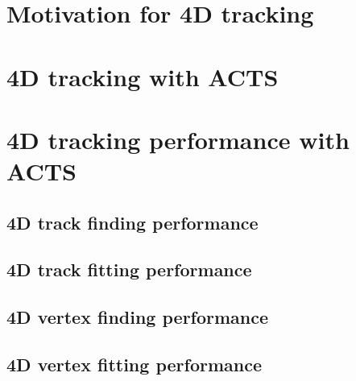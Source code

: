 
\section{Motivation for 4D tracking}


\section{4D tracking with ACTS}

\section{4D tracking performance with ACTS}

\subsection{4D track finding performance}

\subsection{4D track fitting performance}

\subsection{4D vertex finding performance}

\subsection{4D vertex fitting performance}
